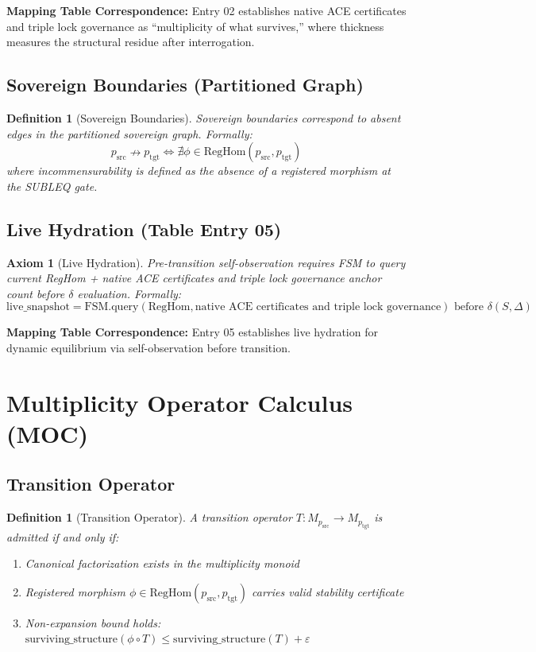 \documentclass[11pt,a4paper]{article}
\newtheorem{definition}[theorem]{Definition}
\newtheorem{axiom}[theorem]{Axiom}
\begin{document}
\textbf{Mapping Table Correspondence:} Entry 02 establishes native ACE certificates and triple lock governance as ``multiplicity of what survives,'' where thickness measures the structural residue after interrogation.

\subsection{Sovereign Boundaries (Partitioned Graph)}

\begin{definition}[Sovereign Boundaries]\label{def:boundaries}
Sovereign boundaries correspond to absent edges in the partitioned sovereign graph. Formally:
$$p_{\text{src}} \nrightarrow p_{\text{tgt}} \iff \nexists \phi \in \text{RegHom}(p_{\text{src}}, p_{\text{tgt}})$$
where incommensurability is defined as the absence of a registered morphism at the SUBLEQ gate.
\end{definition}

\subsection{Live Hydration (Table Entry 05)}

\begin{axiom}[Live Hydration]\label{axiom:hydration}
Pre-transition self-observation requires FSM to query current RegHom + native ACE certificates and triple lock governance anchor count before $\delta$ evaluation. Formally:
$$\text{live\_snapshot} = \text{FSM.query}(\text{RegHom}, \text{native ACE certificates and triple lock governance}) \text{ before } \delta(S, \Delta)$$
\end{axiom}

\textbf{Mapping Table Correspondence:} Entry 05 establishes live hydration for dynamic equilibrium via self-observation before transition.

\section{Multiplicity Operator Calculus (MOC)}

\subsection{Transition Operator}

\begin{definition}[Transition Operator]\label{def:transition}
A transition operator $T: M_{p_{\text{src}}} \to M_{p_{\text{tgt}}}$ is admitted if and only if:
\begin{enumerate}
    \item Canonical factorization exists in the multiplicity monoid
    \item Registered morphism $\phi \in \text{RegHom}(p_{\text{src}}, p_{\text{tgt}})$ carries valid stability certificate
    \item Non-expansion bound holds: $\text{surviving\_structure}(\phi \circ T) \leq \text{surviving\_structure}(T) + \varepsilon$
\end{enumerate}
\end{definition}
\end{document}
